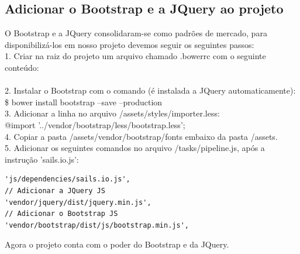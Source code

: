 \documentclass[a4paper,11pt]{article}
\begin{document}
\subsection{Adicionar o Bootstrap e a JQuery ao projeto}
O Bootstrap e a JQuery consolidaram-se como padrões de mercado, para disponibilizá-los em nosso projeto devemos seguir os seguintes passos: \\[3mm]
1. Criar na raiz do projeto um arquivo chamado .bowerrc com o seguinte conteúdo: \\[1mm]
 \textbraceright \\[3mm]
2. Instalar o Bootstrap com o comando (é instalada a JQuery automaticamente): \\[1mm]
{\ttfamily\$ bower install bootstrap --save --production} \\[3mm]
3. Adicionar a linha no arquivo /assets/styles/importer.less: \\[1mm]
{\ttfamily @import '../vendor/bootstrap/less/bootstrap.less';} \\[3mm]
4. Copiar a pasta /assets/vendor/bootstrap/fonts embaixo da pasta /assets. \\[3mm]
5. Adicionar os seguintes comandos no arquivo /tasks/pipeline.js, após a instrução 'sails.io.js':
\begin{lstlisting}
'js/dependencies/sails.io.js',
// Adicionar a JQuery JS
'vendor/jquery/dist/jquery.min.js',
// Adicionar o Bootstrap JS
'vendor/bootstrap/dist/js/bootstrap.min.js',
\end{lstlisting}
Agora o projeto conta com o poder do Bootstrap e da JQuery.
\end{document}
